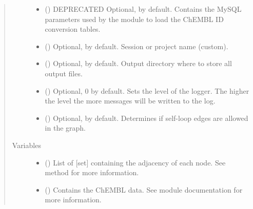 \documentclass[letterpaper,10pt,english]{sphinxmanual}
\begin{document}
\begin{fulllineitems}
\begin{quote}
\begin{description}
\begin{itemize}
\item {} 
 () \textendash{} DEPRECATED Optional,  by default. Contains the MySQL
parameters used by the  module to load
the ChEMBL ID conversion tables.

\item {} 
 () \textendash{} Optional,  by default. Session or project name
(custom).

\item {} 
 () \textendash{} Optional,  by default. Output directory where to
store all output files.

\item {} 
 () \textendash{} Optional, 0 by default. Sets the level of the logger.
The higher the level the more messages will be written to the log.

\item {} 
 () \textendash{} Optional,  by default. Determines if self-loop edges
are allowed in the graph.

\end{itemize}

\item[{Variables}] \leavevmode\begin{itemize}
\item {} 
 () \textendash{} List of {[}set{]} containing the adjacency of each node. See
{\hyperref[\detokenize{reference:pypath.main.PyPath.update_adjlist}]{}} method for more information.

\item {} 
 () \textendash{} Contains the ChEMBL data. See  module
documentation for more information.


\end{itemize}
\end{description}
\end{quote}
\end{fulllineitems}
\end{document}
